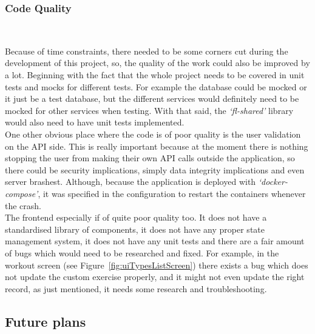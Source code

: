 \documentclass{article}
\newcommand{\vspaceconst}{-2ex}
\begin{document}
\begin{multicols}{2}
\subsubsection{Code Quality}~\label{section:codeQuality}
\vspace{\vspaceconst}

Because of time constraints, there needed to be some corners cut during the development of this project, so, the quality of the work could also be improved by a lot. Beginning with the fact that the whole project needs to be covered in unit tests and mocks for different tests. For example the database could be mocked or it just be a test database, but the different services would definitely need to be mocked for other services when testing. With that said, the \textit{`fl-shared'} library would also need to have unit tests implemented.\\
One other obvious place where the code is of poor quality is the user validation on the API side. This is really important because at the moment there is nothing stopping the user from making their own API calls outside the application, so there could be security implications, simply data integrity implications and even server brashest. Although, because the application is deployed with \textit{`docker-compose'}, it was specified in the configuration to restart the containers whenever the crash.\\
The frontend especially if of quite poor quality too. It does not have a standardised library of components, it does not have any proper state management system, it does not have any unit tests and there are a fair amount of bugs which would need to be researched and fixed. For example, in the workout screen (see Figure~\ref{fig:uiTypesListScreen}) there exists a bug which does not update the custom exercise properly, and it might not even update the right record, as just mentioned, it needs some research and troubleshooting.\\

\subsection{Future plans}
\vspace{\vspaceconst}


\end{multicols}
\end{document}
